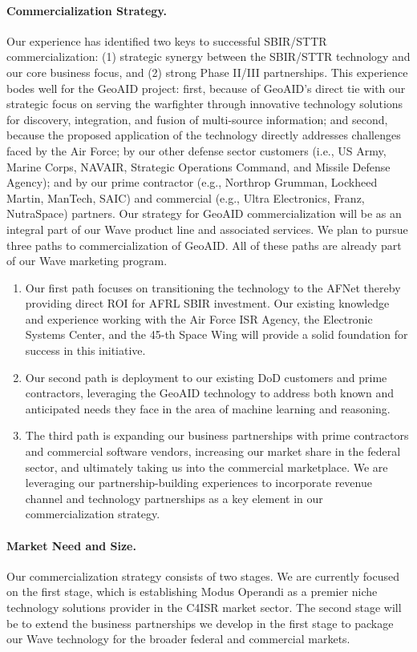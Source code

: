\documentclass{sbir}
\begin{document}
\paragraph{Commercialization Strategy.} Our experience has identified two keys to successful SBIR/STTR commercialization: (1) strategic synergy between the SBIR/STTR technology and our core business focus, and (2) strong Phase II/III partnerships.
This experience bodes well for the GeoAID project: first, because of GeoAID's direct tie with our strategic focus on serving the warfighter through innovative technology solutions for discovery, integration, and fusion of multi-source information; and second, because the proposed application of the technology directly addresses challenges faced by the Air Force; by our other defense sector customers (i.e., US Army, Marine Corps, NAVAIR, Strategic Operations Command, and Missile Defense Agency); and by our prime contractor (e.g., Northrop Grumman, Lockheed Martin, ManTech, SAIC) and commercial (e.g., Ultra Electronics, Franz, NutraSpace) partners.
Our strategy for GeoAID commercialization will be as an integral part of our Wave product line and associated services. We plan to pursue three paths to commercialization of GeoAID. All of these paths are already part of our Wave marketing program.
\begin{enumerate}
  \item Our first path focuses on transitioning the technology to the AFNet thereby providing direct ROI for AFRL SBIR investment. Our existing knowledge and experience working with the Air Force ISR Agency, the Electronic Systems Center, and the 45-th Space Wing will provide a solid foundation for success in this initiative.
  \item Our second path is deployment to our existing DoD customers and prime contractors, leveraging the GeoAID technology to address both known and anticipated needs they face in the area of machine learning and reasoning.
  \item The third path is expanding our business partnerships with prime contractors and commercial software vendors, increasing our market share in the federal sector, and ultimately taking us into the commercial marketplace. We are leveraging our partnership-building experiences to incorporate revenue channel and technology partnerships as a key element in our commercialization strategy.
\end{enumerate}

\paragraph{Market Need and Size.} Our commercialization strategy consists of two stages. We are currently focused on the first stage, which is establishing Modus Operandi as a premier niche technology solutions provider in the C4ISR market sector. The second stage will be to extend the business partnerships we develop in the first stage to package our Wave technology for the broader federal and commercial markets.
\end{document}
